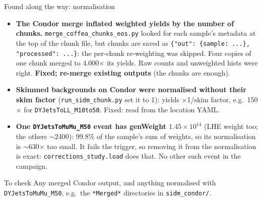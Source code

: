 \documentclass[aspectratio=169,11pt]{beamer}
\newcommand{\code}[1]{{\small\colorbox{codebg}{\texttt{#1}}}}
\begin{document}
\begin{frame}{Found along the way: normalisation}
  \scriptsize
  \begin{itemize}
    \item \textbf{The Condor merge inflated weighted yields by the number of chunks.}
          \code{merge\_coffea\_chunks\_eos.py} looked for each sample's metadata at the top of the
          chunk file, but chunks are saved as \code{\{"out": \{sample: ...\}, "processed": ...\}}: the
          per-chunk re-weighting was skipped. Four copies of one chunk merged to 4.000$\times$ its
          yields. Raw counts and unweighted hists were right. \textbf{Fixed; re-merge existing
          outputs} (the chunks are enough).
    \item \textbf{Skimmed backgrounds on Condor were normalised without their skim factor}
          (\code{run\_sidm\_chunk.py} set it to 1): yields $\times$1/skim factor, e.g.\ 150$\times$ for
          \code{DYJetsToLL\_M10to50}. Fixed: read from the location YAML.
    \item \textbf{One \code{DYJetsToMuMu\_M50} event has genWeight $1.45\times10^{14}$} (LHE weight too;
          the others $\sim$2400): 99.8\% of the sample's sum of weights, so its normalisation is
          $\sim$630$\times$ too small. It fails the trigger, so removing it from the normalisation is
          exact: \code{corrections\_study.load} does that. No other such event in the campaign.
  \end{itemize}
  \vspace{0.3em}
  \begin{block}{To check}
    \footnotesize Any merged Condor output, and anything normalised with
    \code{DYJetsToMuMu\_M50}, e.g.\ the \code{*Merged*} directories in \code{sidm\_condor/}.
  \end{block}
\end{frame}
\end{document}
